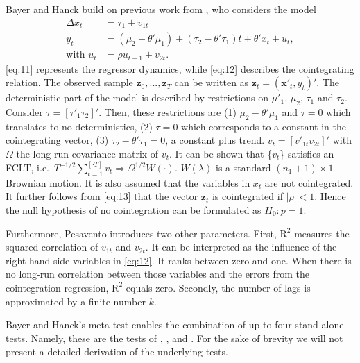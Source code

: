 \documentclass[12pt,a4paper]{article}
\begin{document}
Bayer and Hanck build on previous work from \textcite{Pesavento_2004},
who considers the model \begin{align}
\Delta x_t &= \tau_1 + v_{1t} \label{eq:11} \\
y_t &= (\mu_2 - \theta' \mu_1) + (\tau_2 - \theta' \tau_1) t + \theta' x_t + u_t, \label{eq:12} \\
\text{with } u_t &= \rho u_{t-1} + v_{2t}. \label{eq:13}
\end{align} \eqref{eq:11} represents the regressor dynamics, while
\eqref{eq:12} describes the cointegrating relation. The observed sample
\(\mathbf{z}_0,..., \mathbf{z}_T\) can be written as
\(\mathbf{z}_t = (\mathbf{x}'_t, y_t)'\). The deterministic part of the
model is described by restrictions on \(\mu'_1\), \(\mu_2\), \(\tau_1\)
and \(\tau_2\). Consider \(\tau = [\tau'_1 \tau_2]'\). Then, these
restrictions are (1) \(\mu_2 - \theta' \mu_1\) and \(\tau = 0\) which
translates to no deterministics, (2) \(\tau = 0\) which corresponds to a
constant in the cointegrating vector, (3)
\(\tau_2 - \theta' \tau_1 = 0\), a constant plus trend.
\(v_t = [v'_{1t} v_{2t}]'\) with \(\Omega\) the long-run covariance
matrix of \(v_t\). It can be shown that \{\(v_t\)\} satisfies an FCLT,
i.e.~\(T^{-1/2} \sum^{[\cdot T]}_{t=1} v_t \Rightarrow \Omega^{1/2} W(\cdot)\).
\(W(\lambda)\) is a standard \((n_1 + 1) \times 1\) Brownian motion. It
is also assumed that the variables in \(x_t\) are not cointegrated. It
further follows from \eqref{eq:13} that the vector \(\mathbf{z}_t\) is
cointegrated if \(|\rho| < 1\). Hence the null hypothesis of no
cointegration can be formulated as \(H_0: p = 1\).

Furthermore, Pesavento introduces two other parameters. First,
\(\text{R}^2\) measures the squared correlation of \(v_{1t}\) and
\(v_{2t}\). It can be interpreted as the influence of the right-hand
side variables in \eqref{eq:12}. It ranks between zero and one. When
there is no long-run correlation between those variables and the errors
from the cointegration regression, \(\text{R}^2\) equals zero. Secondly,
the number of lags is approximated by a finite number \(k\).

Bayer and Hanck's meta test enables the combination of up to four
stand-alone tests. Namely, these are the tests of
\textcite{Englegranger_1987}, \textcite{Johansen_1988},
\textcite{Boswijk_1994} and \textcite{Banerjee_1998}. For the sake of
brevity we will not present a detailed derivation of the underlying
tests.
\end{document}
